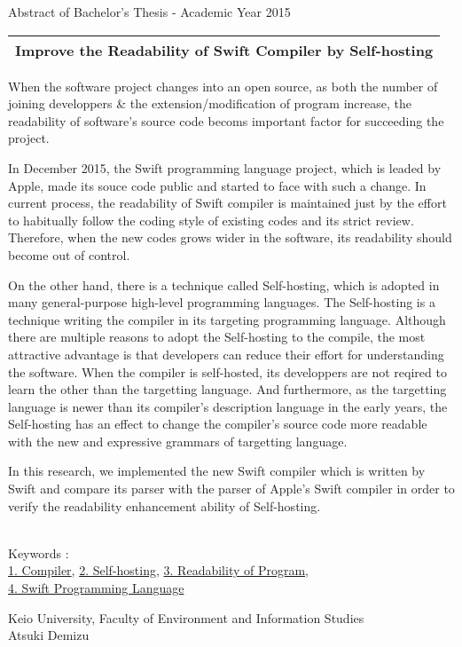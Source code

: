 Abstract of Bachelor's Thesis - Academic Year 2015
\begin{center}
\begin{Large}
\begin{tabular}{|c|} \hline
Improve the Readability of Swift Compiler by Self-hosting
\\
\hline
\end{tabular}
\end{Large}
\end{center}

When the software project changes into an open source, as both the number of joining developpers \& the extension/modification of program increase, the readability of software's source code becoms important factor for succeeding the project.

In December 2015, the Swift programming language project, which is leaded by Apple, made its souce code public and started to face with such a change.
In current process, the readability of Swift compiler is maintained just by the effort to habitually follow the coding style of existing codes and its strict review.
Therefore, when the new codes grows wider in the software, its readability should become out of control.

On the other hand, there is a technique called Self-hosting, which is adopted in many general-purpose high-level programming languages.
The Self-hosting is a technique writing the compiler in its targeting programming language.
Although there are multiple reasons to adopt the Self-hosting to the compile, the most attractive advantage is that developers can reduce their effort for understanding the software.
When the compiler is self-hosted, its developpers are not reqired to learn the other than the targetting language.
And furthermore, as the targetting language is newer than its compiler's description language in the early years, the Self-hosting has an effect to change the compiler's source code more readable with the new and expressive grammars of targetting language.

In this research, we implemented the new Swift compiler which is written by Swift and compare its parser with the parser of Apple's Swift compiler in order to verify the readability enhancement ability of Self-hosting.

~ \\
Keywords : \\
\underline{1. Compiler},
\underline{2. Self-hosting},
\underline{3. Readability of Program},\\
\underline{4. Swift Programming Language}
\begin{flushright}
Keio University, Faculty of Environment and Information Studies\\
Atsuki Demizu
\end{flushright}
